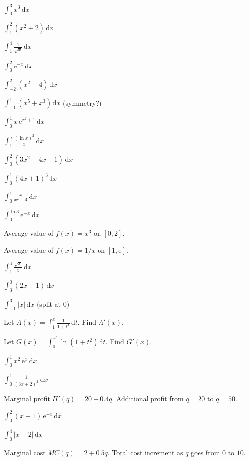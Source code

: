 \begin{problems}
  \item $\displaystyle\int_{0}^{3} x^{3}\,\mathrm{d}x$
  \item $\displaystyle\int_{1}^{2} (x^{2}+2)\,\mathrm{d}x$
  \item $\displaystyle\int_{1}^{4} \frac{1}{\sqrt{x}}\,\mathrm{d}x$
  \item $\displaystyle\int_{0}^{2} \mathrm{e}^{-x}\,\mathrm{d}x$
  \item $\displaystyle\int_{-2}^{2} (x^{2}-4)\,\mathrm{d}x$
  \item $\displaystyle\int_{-1}^{1} (x^{5}+x^{3})\,\mathrm{d}x$ \quad (symmetry?)
  \item $\displaystyle\int_{0}^{1} x\,\mathrm{e}^{x^{2}+1}\,\mathrm{d}x$
  \item $\displaystyle\int_{1}^{\mathrm{e}} \frac{(\ln x)^{2}}{x}\,\mathrm{d}x$
  \item $\displaystyle\int_{0}^{2} (3x^{2}-4x+1)\,\mathrm{d}x$
  \item $\displaystyle\int_{0}^{1} (4x+1)^{3}\,\mathrm{d}x$
  \item $\displaystyle\int_{0}^{1} \frac{x}{x^{2}+4}\,\mathrm{d}x$
  \item $\displaystyle\int_{0}^{\ln 3} \mathrm{e}^{-x}\,\mathrm{d}x$
  \item Average value of $f(x)=x^{3}$ on $[0,2]$.
  \item Average value of $f(x)=1/x$ on $[1,\mathrm{e}]$.
  \item $\displaystyle\int_{1}^{4} \frac{\sqrt{x}}{x}\,\mathrm{d}x$
  \item $\displaystyle\int_{3}^{0} (2x-1)\,\mathrm{d}x$
  \item $\displaystyle\int_{-1}^{3} |x|\,\mathrm{d}x$ \quad (split at $0$)
  \item Let $A(x)=\displaystyle\int_{1}^{x} \frac{1}{1+t^{4}}\,\mathrm{d}t$.
        Find $A'(x)$.
  \item Let $G(x)=\displaystyle\int_{0}^{x^{3}} \ln(1+t^{2})\,\mathrm{d}t$.
        Find $G'(x)$.
  \item $\displaystyle\int_{0}^{1} x^{2}\,\mathrm{e}^{x}\,\mathrm{d}x$
  \item $\displaystyle\int_{0}^{1} \frac{1}{(3x+2)^{2}}\,\mathrm{d}x$
  \item Marginal profit $\Pi'(q)=20-0.4q$. Additional profit from $q=20$
        to $q=50$.
  \item $\displaystyle\int_{0}^{2} (x+1)\,\mathrm{e}^{-x}\,\mathrm{d}x$
  \item $\displaystyle\int_{0}^{4} |x-2|\,\mathrm{d}x$
  \item Marginal cost $MC(q)=2+0.5q$. Total cost increment as $q$ goes
        from $0$ to $10$.
\end{problems}

